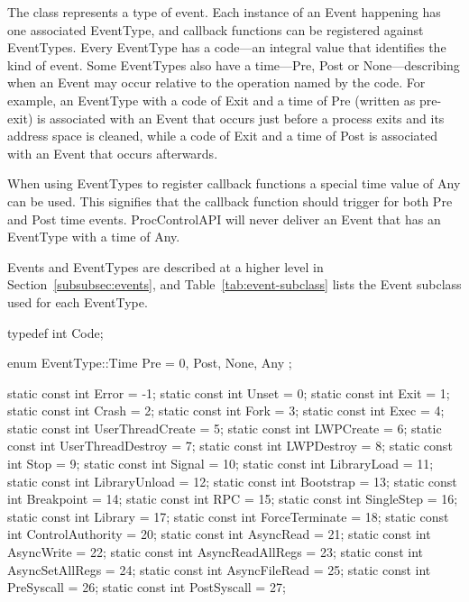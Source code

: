 
The  class represents a type of event. Each instance of an
Event happening has one associated EventType, and callback functions can be
registered against EventTypes. Every EventType has a code---an integral value
that identifies the kind of event. Some EventTypes also have a time---Pre, Post
or None---describing when an Event may occur relative to the operation named by
the code. For example, an EventType with a code of Exit and a time of Pre
(written as pre-exit) is associated with an Event that occurs just before a
process exits and its address space is cleaned, while a code of Exit and a time
of Post is associated with an Event that occurs afterwards.

When using EventTypes to register callback functions a special time value of
Any can be used. This signifies that the callback function should trigger for
both Pre and Post time events. ProcControlAPI will never deliver an Event that
has an EventType with a time of Any.

Events and EventTypes are described at a higher level in
Section~\ref{subsubsec:events}, and Table~\ref{tab:event-subclass} lists the
Event subclass used for each EventType.

\begin{apient}
typedef int Code;

enum EventType::Time {
  Pre = 0,
  Post,
  None,
  Any
};
\end{apient}


\begin{apient}
static const int Error = -1;
static const int Unset = 0;
static const int Exit = 1;
static const int Crash = 2;
static const int Fork = 3;
static const int Exec = 4;
static const int UserThreadCreate = 5;
static const int LWPCreate = 6;
static const int UserThreadDestroy = 7;
static const int LWPDestroy = 8;
static const int Stop = 9;
static const int Signal = 10;
static const int LibraryLoad = 11;
static const int LibraryUnload = 12;
static const int Bootstrap = 13;
static const int Breakpoint = 14;
static const int RPC = 15;
static const int SingleStep = 16;
static const int Library = 17;
static const int ForceTerminate = 18;
static const int ControlAuthority = 20;
static const int AsyncRead = 21;
static const int AsyncWrite = 22;
static const int AsyncReadAllRegs = 23;
static const int AsyncSetAllRegs = 24;
static const int AsyncFileRead = 25;
static const int PreSyscall = 26;
static const int PostSyscall = 27;
\end{apient}

